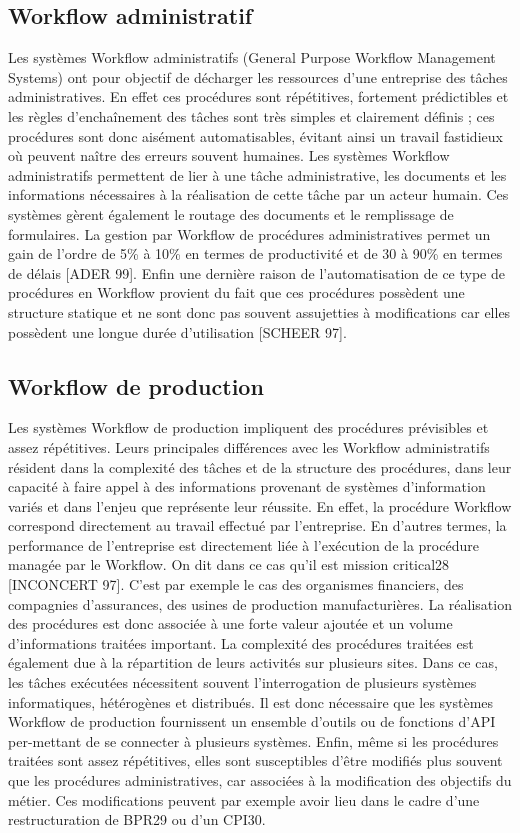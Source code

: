 \subsection{Workflow administratif }
Les systèmes Workflow administratifs (General Purpose Workflow Management Systems) ont pour objectif de décharger les ressources d’une entreprise des tâches administratives. En effet ces procédures sont répétitives, fortement prédictibles et les règles
d’enchaînement des tâches sont très simples et clairement définis ; ces procédures sont donc
aisément automatisables, évitant ainsi un travail fastidieux où peuvent naître des erreurs souvent humaines. Les systèmes Workflow administratifs permettent de lier à une tâche administrative, les documents et les informations nécessaires à la réalisation de cette tâche par un acteur humain. Ces systèmes gèrent également le routage des documents et le remplissage de
formulaires. La gestion par Workflow de procédures administratives permet un gain de
l’ordre de 5\% à 10\% en termes de productivité et de 30 à 90\% en termes de délais [ADER
99]. Enfin une dernière raison de l’automatisation de ce type de procédures en Workflow provient du fait que ces procédures possèdent une structure statique et ne sont donc pas souvent
assujetties à modifications car elles possèdent une longue durée d’utilisation [SCHEER 97]. 
\subsection{Workflow de production} 
Les systèmes Workflow de production impliquent des procédures prévisibles et assez répétitives. Leurs principales différences avec les Workflow administratifs résident dans la
complexité des tâches et de la structure des procédures, dans leur capacité à faire appel à des
informations provenant de systèmes d’information variés et dans l’enjeu que représente leur
réussite. En effet, la procédure Workflow correspond directement au travail effectué par
l’entreprise. En d’autres termes, la performance de l’entreprise est directement liée à
l’exécution de la procédure managée par le Workflow. On dit dans ce cas qu’il est mission
critical28 [INCONCERT 97]. C’est par exemple le cas des organismes financiers, des compagnies d’assurances, des usines de production manufacturières. La réalisation des procédures
est donc associée à une forte valeur ajoutée et un volume d’informations traitées important.
La complexité des procédures traitées est également due à la répartition de leurs activités
sur plusieurs sites. Dans ce cas, les tâches exécutées nécessitent souvent l’interrogation de
plusieurs systèmes informatiques, hétérogènes et distribués. Il est donc nécessaire que les systèmes Workflow de production fournissent un ensemble d’outils ou de fonctions d’API per-mettant de se connecter à plusieurs systèmes. Enfin, même si les procédures traitées sont assez répétitives, elles sont susceptibles d’être modifiés plus souvent que les procédures administratives, car associées à la modification des objectifs du métier. Ces modifications peuvent
par exemple avoir lieu dans le cadre d’une restructuration de BPR29 ou d’un CPI30. 

